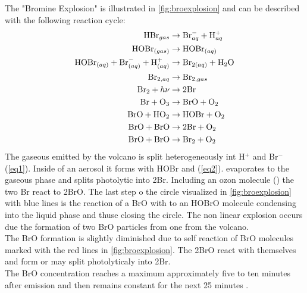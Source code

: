 \documentclass  [
  paper    = a4,
  BCOR     = 10mm,
  twoside,
  fontsize = 12pt,
  fleqn,
  toc      = bibnumbered,
  toc      = listofnumbered,
  numbers  = noendperiod,
  headings = normal,
  listof   = leveldown,
  version  = 3.03
]                                       {scrreprt}
\begin{document}
The "Bromine Explosion" is illustrated in \cref{fig:broexplosion} and can be described with the following reaction cycle:
\begin{align}
\ce{HBr}_{gas} &\rightarrow \ce{Br}^{-}_{aq} + \ce{H}^{+}_{aq} \label{eq1}\\
\ce{HOBr}_{(gas)} &\rightarrow \ce{HOBr}_{(aq)} \\
\ce{HOBr}_{(aq)} + \ce{Br}^{-}_{(aq)} + \ce{H}^{+}_{(aq)} &\rightarrow
\ce{Br}_{2(aq)} +  \ce{H2O}\label{eq2}\\
\ce{Br}_{2,aq} &\rightarrow \ce{Br}_{2,gas} \\
\ce{Br2} + h\nu &\rightarrow 2 \ce{Br} \\
\ce{Br} + \ce{O3} &\rightarrow \ce{BrO} + \ce{O2} \\
\ce{BrO} + \ce{HO2} &\rightarrow \ce{HOBr} + \ce{O2} \\
\ce{BrO} + \ce{BrO} &\rightarrow 2 \ce{Br} + \ce{O2} \\
\ce{BrO} + \ce{BrO} &\rightarrow \ce{Br2} + \ce{O2}
\end{align}
The gaseous  emitted by the volcano is split heterogeneously int H$^{+}$ and Br$^{-}$ (\cref{eq1}). Inside of an aerosol it forms with HOBr  and  (\cref{eq2}).  evaporates to the gaseous phase and splits photolytic  into 2Br. Including an ozon molecule () the two Br react to 2BrO. The last step o the circle visualized in \cref{fig:broexplosion} with blue lines is the reaction of a BrO with  to an HOBrO molecule condensing into the liquid phase  and thuse closing the circle. The non linear explosion occurs due the formation of two BrO particles from one  from the volcano.\\
The BrO formation is slightly diminished due to self reaction of BrO molecules marked with the red lines in \cref{fig:broexplosion}. The 2BrO react with themselves and form  or may split photolyticaly into 2Br.\\
The BrO concentration reaches a maximum approximately five to ten minutes after emission and then remains constant for the next 25 minutes \citep{lubcke2014bro}.
%
\end{document}
